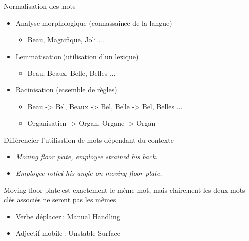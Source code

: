 \begin{frame}
	Normalisation des mots
	\begin{itemize}
		\item Analyse morphologique (connassaince de la langue)
		\begin{itemize}
			\item Beau, Magnifique, Joli ...
		\end{itemize}	
		\item Lemmatisation (utilisation d'un lexique)
		\begin{itemize}
			\item Beau, Beaux, Belle, Belles ...
		\end{itemize}	
		\item Racinisation (ensemble de règles)
		\begin{itemize}
			\item Beau -> Bel, Beaux -> Bel, Belle -> Bel, Belles ...
			\item Organisation -> Organ, Organe -> Organ
		\end{itemize}	
		
	\end{itemize}
\end{frame}

\begin{frame}	
	Différencier l'utilisation de mots dépendant du contexte
	\begin{itemize}
		\item \textit{Moving floor plate, employee strained his back.}\\
		\item \textit{Employee rolled his angle on moving floor plate.}\\
	\end{itemize}
	Moving floor plate est exactement le même mot, mais clairement les deux mots clés associés ne seront pas les mêmes
	\begin{itemize}
		\item Verbe déplacer : Manual Handling\\
		\item Adjectif mobile : Unstable Surface\\
	\end{itemize}	
\end{frame}

